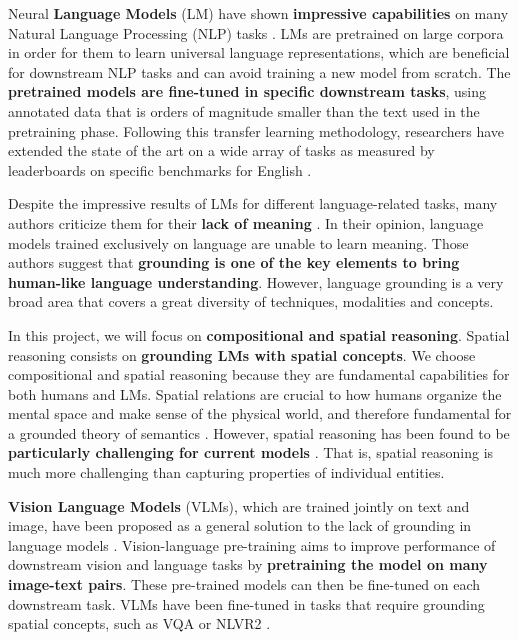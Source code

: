 Neural \textbf{Language Models} (LM) have shown \textbf{impressive capabilities} on many Natural Language Processing (NLP) tasks \cite{wang2019superglue, brown2020language, chowdhery2022palm}. LMs are pretrained on large corpora in order for them to learn universal language representations, which are beneficial for downstream NLP tasks and can avoid training a new model from scratch. The \textbf{pretrained models are fine-tuned in specific downstream tasks}, using annotated data that is orders of magnitude smaller than the text used in the pretraining phase. Following this transfer learning methodology, researchers have extended the state of the art on a wide array of tasks as measured by leaderboards on specific benchmarks for English \cite{bommasani2021opportunities, wang2019superglue}.

Despite the impressive results of LMs for different language-related tasks, many authors criticize them for their \textbf{lack of meaning} \cite{bender2020climbing, bender2021dangers}. In their opinion, language models trained exclusively on language are unable to learn meaning. Those authors suggest that \textbf{grounding is one of the key elements to bring human-like language understanding}. However, language grounding is a very broad area that covers a great diversity of techniques, modalities and concepts. 

In this project, we will focus on \textbf{compositional and spatial reasoning}. Spatial reasoning consists on \textbf{grounding LMs with spatial concepts}. We choose compositional and spatial reasoning because they are fundamental capabilities for both humans and LMs. Spatial relations are crucial to how humans organize the mental space and make sense of the physical world, and therefore fundamental for a grounded theory of semantics \cite{levinson2003space}. However, spatial reasoning has been found to be \textbf{particularly challenging for current models} \cite{akula2020words}. That is, spatial reasoning is much more challenging than capturing properties of individual entities.

\textbf{Vision Language Models} (VLMs), which are trained jointly on text and image, have been proposed as a general solution to the lack of grounding in language models \cite{lu2019vilbert, tan2020lxmert, ramesh2022hierarchical, saharia2022photorealistic}. Vision-language pre-training aims to improve performance of downstream vision and language tasks by \textbf{pretraining the model on many image-text pairs}. These pre-trained models can then be fine-tuned on each downstream task. VLMs have been fine-tuned in tasks that require grounding spatial concepts, such as VQA \cite{antol2015vqa} or NLVR2 \cite{suhr2018corpus}.

